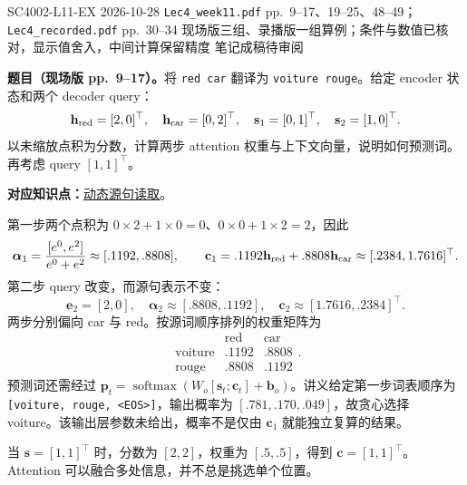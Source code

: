 
\begingroup
\linespread{1.15}\selectfont
\setlength{\parskip}{0.4em}
\renewcommand{\recordid}[1]{}
\renewcommand{\relatedtopic}[2]{\hyperref[topic:#1]{#2}}

\examplemeta
  {SC4002-L11-EX}
  {2026-10-28}
  {\texttt{Lec4\_week11.pdf} pp.~9--17、19--25、48--49；\texttt{Lec4\_recorded.pdf} pp.~30--34}
  {现场版三组、录播版一组算例；条件与数值已核对，显示值舍入，中间计算保留精度}
  {笔记成稿待审阅}

\nopagebreak[4]
\textbf{题目（现场版 pp.~9--17）。}将 \texttt{red car} 翻译为 \texttt{voiture rouge}。给定 encoder 状态和两个 decoder query：
\[
 \mathbf h_{\rm red}=[2,0]^\top,\quad
 \mathbf h_{\rm car}=[0,2]^\top,\quad
 \mathbf s_1=[0,1]^\top,\quad\mathbf s_2=[1,0]^\top.
\]
以未缩放点积为分数，计算两步 attention 权重与上下文向量，说明如何预测词。再考虑 query $[1,1]^\top$。

\textbf{对应知识点：}\relatedtopic{SC4002-L11-T01}{动态源句读取}。

\begin{workedsolution}
第一步两个点积为 $0\times2+1\times0=0$、$0\times0+1\times2=2$，因此
\[
 \boldsymbol\alpha_1=\frac{[e^0,e^2]}{e^0+e^2}
 \approx[.1192,.8808],\qquad
 \mathbf c_1=.1192\mathbf h_{\rm red}+.8808\mathbf h_{\rm car}
 \approx[.2384,1.7616]^\top.
\]
第二步 query 改变，而源句表示不变：
\[
 \mathbf e_2=[2,0],\quad\boldsymbol\alpha_2\approx[.8808,.1192],\quad
 \mathbf c_2\approx[1.7616,.2384]^\top.
\]
两步分别偏向 car 与 red。按源词顺序排列的权重矩阵为
\[
 \begin{array}{c|cc}
 &\mathrm{red}&\mathrm{car}\\\hline
 \mathrm{voiture}&.1192&.8808\\
 \mathrm{rouge}&.8808&.1192
 \end{array}.
\]
预测词还需经过 $\mathbf p_t=\operatorname{softmax}(W_o[\mathbf s_t;\mathbf c_t]+\mathbf b_o)$。讲义给定第一步词表顺序为 \texttt{[voiture, rouge, <EOS>]}，输出概率为 $[.781,.170,.049]$，故贪心选择 voiture。该输出层参数未给出，概率不是仅由 $\mathbf c_1$ 就能独立复算的结果。

当 $\mathbf s=[1,1]^\top$ 时，分数为 $[2,2]$，权重为 $[.5,.5]$，得到 $\mathbf c=[1,1]^\top$。Attention 可以融合多处信息，并不总是挑选单个位置。
\end{workedsolution}

